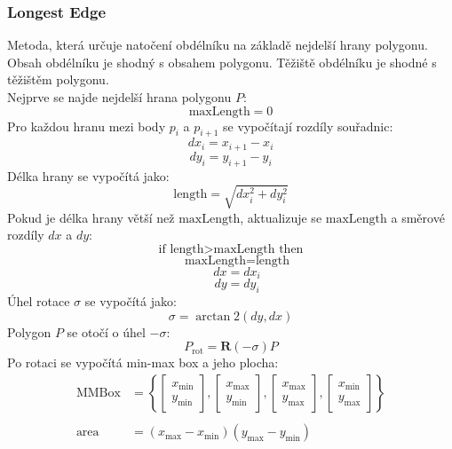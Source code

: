 \subsubsection{Longest Edge}
Metoda, která určuje natočení obdélníku na základě nejdelší hrany polygonu. Obsah obdélníku je shodný s obsahem polygonu. Těžiště obdélníku je shodné s těžištěm polygonu.\\ Nejprve se najde nejdelší hrana polygonu \( P \):
\begin{equation}
    \text{maxLength} = 0
\end{equation}
Pro každou hranu mezi body \( p_i \) a \( p_{i+1} \) se vypočítají rozdíly souřadnic:
\begin{equation}
    dx_i = x_{i+1} - x_i
\end{equation}
\begin{equation}
    dy_i = y_{i+1} - y_i
\end{equation}
Délka hrany se vypočítá jako:
\begin{equation}
    \text{length} = \sqrt{dx_i^2 + dy_i^2}
\end{equation}
Pokud je délka hrany větší než \( \text{maxLength} \), aktualizuje se \( \text{maxLength} \) a směrové rozdíly \( dx \) a \( dy \):
\begin{equation}
    \text{if } \text{length} > \text{maxLength} \text{ then}
\end{equation}
\begin{equation}
    \quad \text{maxLength} = \text{length}
\end{equation}
\begin{equation}
    \quad dx = dx_i
\end{equation}
\begin{equation}
    \quad dy = dy_i
\end{equation}
Úhel rotace \( \sigma \) se vypočítá jako:
\begin{equation}
    \sigma = \arctan2(dy, dx)
\end{equation}
Polygon \( P \) se otočí o úhel \( -\sigma \):
\begin{equation}
    P_{\text{rot}} = \mathbf{R}(-\sigma) P
\end{equation}
Po rotaci se vypočítá min-max box a jeho plocha:
\begin{align}
    \text{MMBox} &= \left\{
    \begin{bmatrix} x_{\min} \\ y_{\min} \end{bmatrix},
    \begin{bmatrix} x_{\max} \\ y_{\min} \end{bmatrix},
    \begin{bmatrix} x_{\max} \\ y_{\max} \end{bmatrix},
    \begin{bmatrix} x_{\min} \\ y_{\max} \end{bmatrix}
    \right\}\\
    \nonumber\\
    \text{area} &= (x_{\max} - x_{\min})(y_{\max} - y_{\min})
\end{align}
